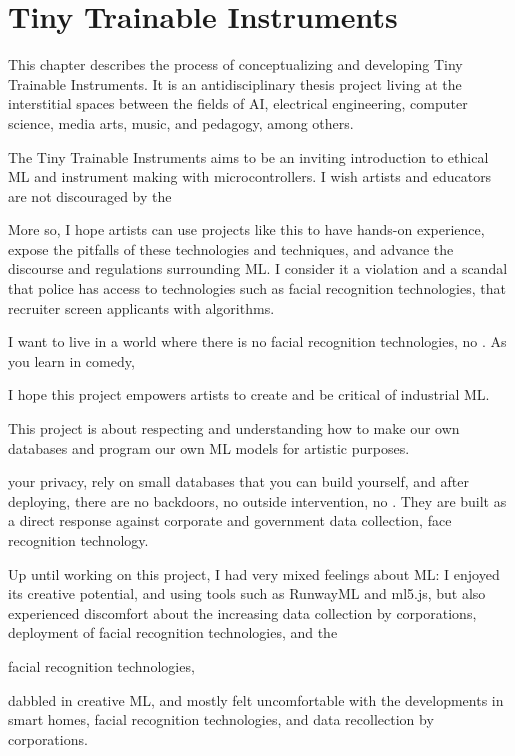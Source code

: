 \chapter{Tiny Trainable Instruments}

This chapter describes the process of conceptualizing and developing Tiny Trainable Instruments. It is an antidisciplinary thesis project living at the interstitial spaces between the fields of \acrlong{AI}, electrical engineering, computer science, media arts, music, and pedagogy, among others.

The Tiny Trainable Instruments aims to be an inviting introduction to ethical \acrshort{ML} and instrument making with microcontrollers. I wish artists and educators are not discouraged by the 

More so, I hope artists can use projects like this to have hands-on experience, expose the pitfalls of these technologies and techniques, and advance the discourse and regulations surrounding \acrshort{ML}. I consider it a violation and a scandal that police has access to technologies such as facial recognition technologies, that recruiter screen applicants with algorithms.

I want to live in a world where there is no facial recognition technologies, no . As you learn in comedy, 

I hope this project empowers artists to create and be critical of industrial \acrshort{ML}.

This project is about respecting and understanding how to make our own databases and program our own \acrshort{ML} models for artistic purposes.

your privacy, rely on small databases that you can build yourself, and after deploying, there are no backdoors, no outside intervention, no . They are built as a direct response against corporate and government data collection, face recognition technology.

Up until working on this project, I had very mixed feelings about \acrshort{ML}: I enjoyed its creative potential, and using tools such as RunwayML and ml5.js, but also experienced discomfort about the increasing data collection by corporations, deployment of facial recognition technologies, and the 

 facial recognition technologies, 



 dabbled in creative \acrshort{ML}, and mostly felt uncomfortable with the developments in smart homes, facial recognition technologies, and data recollection by corporations.


